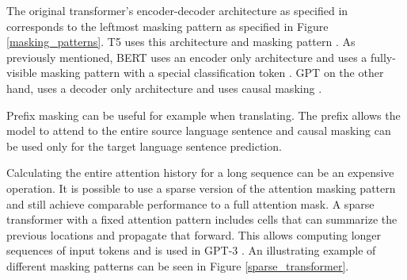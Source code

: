 \documentclass[twoside]{article}
\begin{document}
The original transformer's encoder-decoder architecture as specified in 
\cite{vaswani_attention_2017} corresponds to the leftmost masking pattern as
specified in Figure \ref{masking_patterns}. T5 uses this architecture and masking pattern
\cite{raffel_exploring_2020}. As previously mentioned, BERT uses an encoder
only architecture \cite{devlin_bert_2019} and uses a fully-visible masking 
pattern with a special classification token \cite{raffel_exploring_2020}. GPT on
the other hand, uses a decoder only architecture \cite{radford_improving_nodate}
and uses causal masking \cite{liu_generating_2018}.

Prefix masking can be useful for example when translating. The prefix allows the
model to attend to the entire source language sentence and causal masking can be 
used only for the target language sentence prediction. \cite{raffel_exploring_2020}

Calculating the entire attention history for a long sequence can be an expensive operation.
It is possible to use a sparse version of the attention masking pattern and still achieve 
comparable performance to a full attention mask. A sparse transformer with a fixed attention
pattern includes cells that can summarize the previous locations and propagate 
that forward. This allows computing longer sequences of input tokens and is used in GPT-3
\cite{brown_language_2020}. An illustrating example of different masking patterns
can be seen in Figure \ref{sparse_transformer}. \cite{child_generating_2019}
\end{document}
